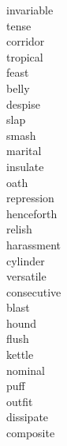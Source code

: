 \documentclass[a4paper, 11pt]{ctexart}
\begin{document}
\begin{multicols*}{3}
\begin{description}
\item[invariable]

\item[tense]

\item[corridor]

\item[tropical]

\item[feast]

\item[belly]

\item[despise]

\item[slap]

\item[smash]

\item[marital]

\item[insulate]

\item[oath]

\item[repression]

\item[henceforth]

\item[relish]

\item[harassment]

\item[cylinder]

\item[versatile]

\item[consecutive]

\item[blast]

\item[hound]

\item[flush]

\item[kettle]

\item[nominal]

\item[puff]

\item[outfit]

\item[dissipate]

\item[composite]


\end{description}
\end{multicols*}
\end{document}
